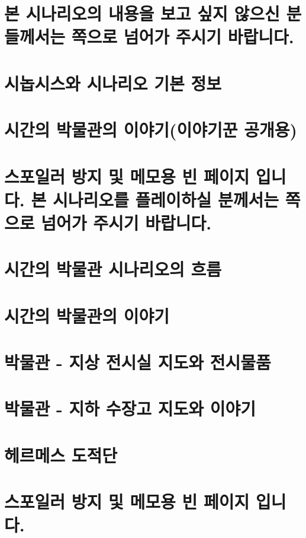 \documentclass{report}
\begin{document}
	\chapter*{본 시나리오의 내용을 보고 싶지 않으신 분들께서는 \pageref{endof_MoT}쪽으로 넘어가 주시기 바랍니다.}
	
	\chapter{시놉시스와 시나리오 기본 정보}
		
	
	\chapter{시간의 박물관의 이야기(이야기꾼 공개용)}
		
	
	\chapter*{스포일러 방지 및 메모용 빈 페이지 입니다. 본 시나리오를 플레이하실 분께서는 \pageref{endof_MoT}쪽으로 넘어가 주시기 바랍니다.}
	
	\parttoc
	
	\chapter{시간의 박물관 시나리오의 흐름}
		
	
	\chapter{시간의 박물관의 이야기}
		
	
	\chapter{박물관 - 지상 전시실 지도와 전시물품}
		
	
	\chapter{박물관 - 지하 수장고 지도와 이야기}
		
	
	\chapter{헤르메스 도적단}
		
	
	\chapter*{스포일러 방지 및 메모용 빈 페이지 입니다.}
\end{document}
